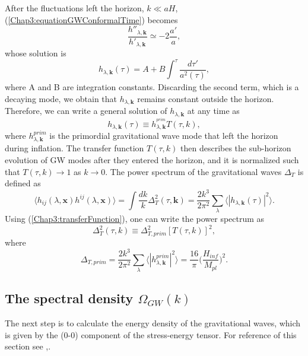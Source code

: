 \documentclass[11pt,a4paper,twoside]{book}
\begin{document}
After the fluctuations left the horizon, $ k \ll aH $, (\ref{Chap3:equationGWConformalTime}) becomes
\begin{equation}
	\label{Chap3:solutionEquationConformalTime1}
	\frac{h''_{\lambda,\textbf{k}}}{h'_{\lambda,\textbf{k}}} \simeq -2 \frac{a'}{a}, 
\end{equation}
whose solution is
\begin{equation}
	\label{Chap3:solutionGWEquationConformalTime2}
	h_{\lambda,\textbf{k}}(\tau)=A + B \int_{}^{\tau}\frac{d\tau '}{a^{2}(\tau)},
\end{equation}
where A and B are integration constants. Discarding the second term, which is a decaying mode, we obtain that $ h_{\lambda,\textbf{k}} $ remains constant outside the horizon. Therefore, we can write a general solution of $ h_{\lambda,\textbf{k}} $ at any time as 
\begin{equation}
	\label{Chap3:transferFunction}
	h_{\lambda,\textbf{k}}(\tau) \equiv h_{\lambda,\textbf{k}}^{^{prim}}T(\tau, k),
\end{equation}
where $ h^{prim}_{\lambda,\textbf{k}} $ is the primordial gravitational wave mode that left the horizon during inflation. The transfer function $ T(\tau,k) $ then describes the sub-horizon evolution of GW modes after they  entered the horizon, and it is normalized such that $T (\tau,k) \rightarrow 1 $ as $ k \rightarrow 0$. The power spectrum of the gravitational waves $\Delta_{T}$ is defined as
\begin{equation}
	\langle h_{ij}(\lambda,\textbf{x})h^{ij}(\lambda,\textbf{x})\rangle = \int \frac{dk}{k}\Delta_{T}^{2}(\tau,\textbf{k}) = \frac{2k^{3}}{2\pi^{2}}\sum_{\lambda}\langle|h_{\lambda,\textbf{k}}(\tau)|^{2}\rangle.
\end{equation}
Using (\ref{Chap3:transferFunction}), one can write the power spectrum as 
\begin{equation}
	\label{Chap3:powerSpectrumTransferFunction}
	\Delta_{T}^{2}(\tau,k) \equiv \Delta^{2}_{T,prim}[T(\tau,k)]^{2},
\end{equation}
where
\begin{equation}
	\label{Chap3:DeltaTPrim}
\Delta_{T,prim} = \frac{2k^{3}}{2\pi^{2}}\sum_{\lambda}\langle|h^{prim}_{\lambda,\mathbf{k}}|^{2}\rangle = \frac{16}{\pi} \Big (\frac{H_{inf}}{M_{pl}}\Big)^{2}.
\end{equation}

\subsection{The spectral density $\Omega_{GW}(k)$}
The next step is to calculate the energy density of the gravitational waves, which is given by the (0-0) component of the stress-energy tensor. For reference of this section see \cite{Chap3:GW_Watanabe_Komatsu},\cite{Chap3: Gravitation}.
\end{document}
